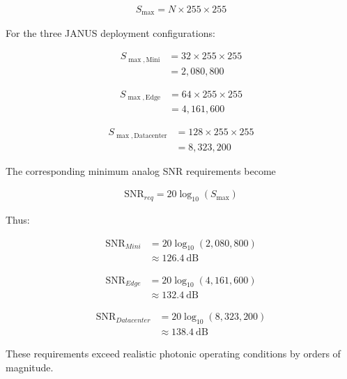 \documentclass[journal]{IEEEtran}
\begin{document}
\begin{align}
S_{\max} = N \times 255 \times 255
\label{eq:general_accumulation}
\end{align}

For the three JANUS deployment configurations:

\begin{align}
S_{\max,\mathrm{Mini}} &= 32 \times 255 \times 255 \\
&= 2{,}080{,}800
\end{align}

\begin{align}
S_{\max,\mathrm{Edge}} &= 64 \times 255 \times 255 \\
&= 4{,}161{,}600
\end{align}

\begin{align}
S_{\max,\mathrm{Datacenter}} &= 128 \times 255 \times 255 \\
&= 8{,}323{,}200
\end{align}

The corresponding minimum analog SNR requirements become

\begin{align}
\mathrm{SNR}_{req} = 20\log_{10}\left(S_{\max}\right)
\label{eq:general_snr}
\end{align}

Thus:

\begin{align}
\mathrm{SNR}_{Mini} &= 20\log_{10}(2{,}080{,}800) \\
&\approx 126.4~\mathrm{dB}
\end{align}

\begin{align}
\mathrm{SNR}_{Edge} &= 20\log_{10}(4{,}161{,}600) \\
&\approx 132.4~\mathrm{dB}
\end{align}

\begin{align}
\mathrm{SNR}_{Datacenter} &= 20\log_{10}(8{,}323{,}200) \\
&\approx 138.4~\mathrm{dB}
\end{align}

These requirements exceed realistic photonic operating conditions by orders of magnitude.
\end{document}

